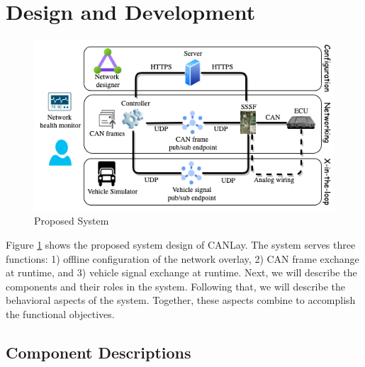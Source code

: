 \documentclass[letterpaper,twocolumn,12pt]{article}
\begin{document}
\section{Design and Development}\label{sec:design}
\begin{figure}[]
    \centering
    \includegraphics[width=\linewidth]{images/system_design.drawio.png}
    \caption{Proposed System}
    \label{fig:system}
\end{figure}
Figure \ref{fig:system} shows the proposed system design of CANLay. The system serves three functions: 1) offline configuration of the network overlay,  2) CAN frame exchange at runtime, and 3) vehicle signal exchange at runtime. 
Next, we will describe the components and their roles in the system. 
Following that, we will describe the behavioral aspects of the system. 
Together, these aspects combine to accomplish the functional objectives.



\subsection{Component Descriptions}
\end{document}
